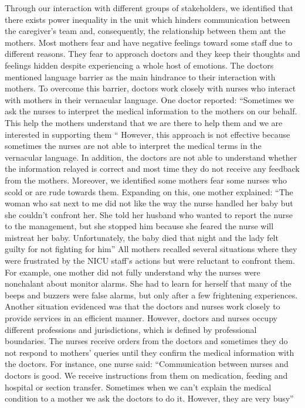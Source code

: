 Through our interaction with different groups of stakeholders, we identified that there exists power inequality in the unit which hinders ﻿communication between the caregiver's team and, consequently, the relationship between them ant the mothers. Most mothers fear and have negative feelings toward some staff due to different reasons. They fear to approach doctors and ﻿they keep their thoughts and feelings hidden despite experiencing a whole host of emotions. The doctors mentioned language barrier as the main hindrance to their interaction with mothers. To overcome this barrier, doctors work closely with nurses who interact with mothers in their vernacular language. One doctor reported:
“Sometimes we ask the nurses to interpret the medical information to the mothers on our behalf. This help the mothers understand that we are there to help them and we are interested in supporting them “
However, this approach is not effective because sometimes the nurses are not able to interpret the medical terms in the vernacular language. In addition, the doctors are not able to understand whether the information relayed is correct and most time they do not receive any feedback from the mothers. Moreover, we identified some mothers fear some nurses who scold or are rude towards them. Expanding on this, one mother explained:
“The woman who sat next to me did not like the way the nurse handled her baby but she couldn't confront her. She told her husband who wanted to report the nurse to the management, but she stopped him because she feared the nurse will mistreat her baby. Unfortunately, the baby died that night and the lady felt guilty for not fighting for him”
All mothers recalled several situations where they were frustrated by the NICU staff’s actions but were reluctant to confront them. For example, one mother did not fully understand why the nurses were nonchalant about monitor alarms. She had to learn for herself that many of the beeps and buzzers were false alarms, but only after a few frightening experiences. 
Another situation evidenced was that the doctors and nurses work closely to provide services in an efficient manner. However, doctors and nurses occupy different professions and jurisdictions, which is defined by professional boundaries. The nurses receive orders from the doctors and sometimes they do not respond to mothers’ queries until they confirm the medical information with the doctors. For instance, one nurse said:
“Communication between nurses and doctors is good. We receive instructions from them on medication, feeding and hospital or section transfer. Sometimes when we can’t explain the medical condition to a mother we ask the doctors to do it. However, they are very busy”

